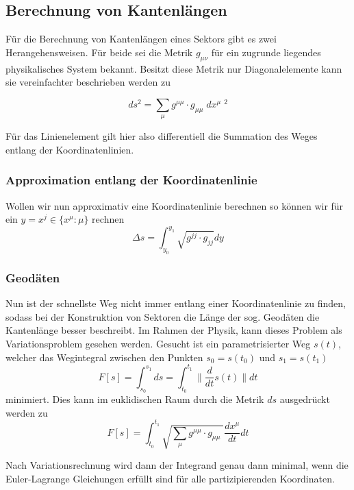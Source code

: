 \documentclass{article}
\begin{document}
\subsection{Berechnung von Kantenlängen}

Für die Berechnung von Kantenlängen eines Sektors gibt es zwei Herangehensweisen. Für beide sei die Metrik $g_{\mu\nu}$ für ein zugrunde liegendes physikalisches System bekannt. Besitzt diese Metrik nur Diagonalelemente kann sie vereinfachter beschrieben werden zu 

\begin{equation}
ds^2=\sum_{\mu} g^{\mu\mu} \cdot g_{\mu\mu} \; {dx^{\mu}}\;^2
\end{equation}

Für das Linienelement gilt hier also differentiell die Summation des Weges entlang der Koordinatenlinien. 
\subsubsection{Approximation entlang der Koordinatenlinie}
Wollen wir nun approximativ eine Koordinatenlinie berechnen so können wir für ein $y=x^j\in \{ x^\mu : \mu \}$ rechnen 
\begin{equation}
\Delta s = \int_{y_0}^{y_1} \sqrt{ g^{jj}\cdot g_{jj} } dy
\end{equation}
\subsubsection{Geodäten}
Nun ist der schnellste Weg nicht immer entlang einer Koordinatenlinie zu finden, sodass bei der Konstruktion von Sektoren die Länge der sog. Geodäten die Kantenlänge besser beschreibt. Im Rahmen der Physik, kann dieses Problem als Variationsproblem gesehen werden. Gesucht ist ein parametrisierter Weg $s(t)$, welcher das Wegintegral zwischen den Punkten $s_0=s(t_0)$ und $s_1=s(t_1)$ 
\begin{equation}
F[s]= \int_{s_0}^{s_1} ds =\int_{t_0}^{t_1} \|\frac{d}{dt}s(t)\|dt
\end{equation}
minimiert. Dies kann im euklidischen Raum durch die Metrik $ds$ ausgedrückt werden zu 
\begin{equation}
F[s]=\int_{t_0}^{t_1} \sqrt{ \sum_{\mu} g^{\mu\mu} \cdot g_{\mu\mu} \;} \frac{dx^{\mu}}{dt}dt
\end{equation}

Nach Variationsrechnung wird dann der Integrand genau dann minimal, wenn die Euler-Lagrange Gleichungen erfüllt sind für alle partizipierenden Koordinaten. 
\end{document}
